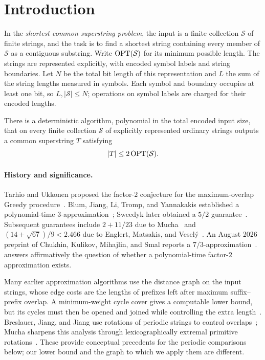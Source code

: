 \section{Introduction}\label{sec:intro}

In the \emph{shortest common superstring problem}, the input is a finite collection $\mathcal S$ of finite strings, and the task is to find a shortest string containing every member of $\mathcal S$ as a contiguous substring. Write $\operatorname{OPT}(\mathcal S)$ for its minimum possible length. The strings are represented explicitly, with encoded symbol labels and string boundaries. Let $N$ be the total bit length of this representation and $L$ the sum of the string lengths measured in symbols. Each symbol and boundary occupies at least one bit, so $L,|\mathcal S|\le N$; operations on symbol labels are charged for their encoded lengths.

\begin{theorem}\label{thm:main}
There is a deterministic algorithm, polynomial in the total encoded input size, that on every finite collection $\mathcal S$ of explicitly represented ordinary strings outputs a common superstring $T$ satisfying
\[
\lvert T\rvert\le 2\operatorname{OPT}(\mathcal S).
\]
\end{theorem}

\paragraph{History and significance.}
Tarhio and Ukkonen proposed the factor-$2$ conjecture for the maximum-overlap Greedy procedure~\cite{tarhio1988}. Blum, Jiang, Li, Tromp, and Yannakakis established a polynomial-time $3$-approximation~\cite{blum1994}; Sweedyk later obtained a $5/2$ guarantee~\cite{sweedyk1999}. Subsequent guarantees include $2+11/23$ due to Mucha~\cite{mucha2013} and $(14+\sqrt{67})/9<2.466$ due to Englert, Matsakis, and Vesel\'{y}~\cite{emv2023}. An August 2026 preprint of Chukhin, Kulikov, Mihajlin, and Smal reports a $7/3$-approximation~\cite{cycle2026}.  answers affirmatively the question of whether a polynomial-time factor-$2$ approximation exists.

Many earlier approximation algorithms use the distance graph on the input strings, whose edge costs are the lengths of prefixes left after maximum suffix--prefix overlap. A minimum-weight cycle cover gives a computable lower bound, but its cycles must then be opened and joined while controlling the extra length~\cite{blum1994}. Breslauer, Jiang, and Jiang use rotations of periodic strings to control overlaps~\cite{breslauer1997}; Mucha sharpens this analysis through lexicographically extremal primitive rotations~\cite{mucha2013}. These provide conceptual precedents for the periodic comparisons below; our lower bound and the graph to which we apply them are different.

